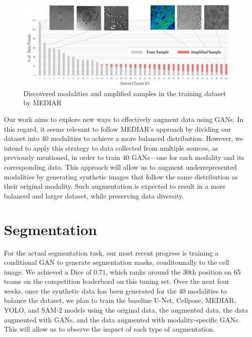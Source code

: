 \documentclass[]{article}
\begin{document}
\begin{figure}[H]
    \centering
    \includegraphics[width=0.6\linewidth]{reports/images/graph_modalities_mediar.png}
    \caption{Discovered modalities and amplified samples in the training dataset by MEDIAR}
\end{figure}

Our work aims to explore new ways to effectively augment data using GANs. In this regard, it seems relevant to follow MEDIAR's approach by dividing our dataset into 40 modalities to achieve a more balanced distribution. However, we intend to apply this strategy to data collected from multiple sources, as previously mentioned, in order to train 40 GANs—one for each modality and its corresponding data. This approach will allow us to augment underrepresented modalities by generating synthetic images that follow the same distribution as their original modality. Such augmentation is expected to result in a more balanced and larger dataset, while preserving data diversity.

\section{Segmentation}
For the actual segmentation task, our most recent progress is training a conditional GAN to generate segmentation masks, conditonnally to the cell image. We achieved a Dice of $0.71$, which ranks around the 30th position on 65 teams on the competition leaderbord on this tuning set.     
Over the next four weeks, once the synthetic data has been generated for the 40 modalities to balance the dataset, we plan to train the baseline U-Net, Cellpose, MEDIAR, YOLO, and SAM-2 models using the original data, the augmented data, the data augmented with GANs, and the data augmented with modality-specific GANs. This will allow us to observe the impact of each type of augmentation.
\end{document}
